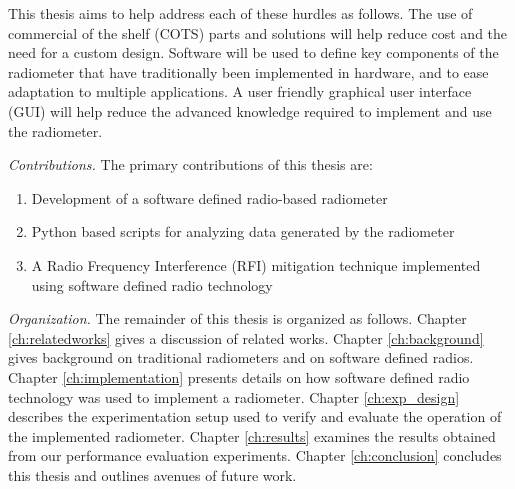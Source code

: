 This thesis aims to help address each of these hurdles as follows.  The use of commercial of the shelf (COTS) parts and solutions will help reduce cost and the need for a custom design.  Software will be used to define key components of the radiometer that have traditionally been implemented in hardware, and to ease adaptation to multiple applications.  A user friendly graphical user interface (GUI) will help reduce the advanced knowledge required to implement and use the radiometer. 

\emph{Contributions.}  The primary contributions of this thesis are:

\begin{enumerate}
\item Development of a software defined radio-based radiometer
\item Python based scripts for analyzing data generated by the radiometer
\item A Radio Frequency Interference (RFI) mitigation technique implemented using software defined radio technology
\end{enumerate}

\emph{Organization.}  The remainder of this thesis is organized as follows.  Chapter \ref{ch:relatedworks} gives a discussion of related works.  Chapter \ref{ch:background} gives background on traditional radiometers and on software defined radios.  Chapter \ref{ch:implementation} presents details on how software defined radio technology was used to implement a radiometer.  Chapter \ref{ch:exp_design} describes the experimentation setup used to verify and evaluate the operation of the implemented radiometer.  Chapter \ref{ch:results} examines the results obtained from our performance evaluation experiments.  Chapter \ref{ch:conclusion} concludes this thesis and outlines avenues of future work.



